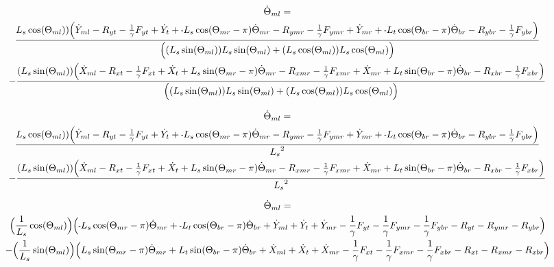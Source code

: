 \documentclass[11pt, landscape]{article}
\newcommand{\mn}{\scalebox{0.7}[1.0]{-}}
\begin{document}
\begin{multline}
\dot{\Theta}_{ml} = \\
\frac{L_{s}\cos(\Theta_{ml})) \Big( \dot{Y}_{ml} - R_{yt} - \frac{1}{\gamma}F_{yt } + \dot{Y}_{t } + \mn L_{s}\cos(\Theta_{mr}-\pi)  \dot{\Theta}_{mr}
- R_{ymr} - \frac{1}{\gamma}F_{ymr} + \dot{Y}_{mr} + \mn L_{t}\cos(\Theta_{br}-\pi)  \dot{\Theta}_{br} - R_{ybr} - \frac{1}{\gamma}F_{ybr}\Big)}
{\Big((L_{s}\sin(\Theta_{ml}))L_{s}\sin(\Theta_{ml}) + (L_{s}\cos(\Theta_{ml}))L_{s}\cos(\Theta_{ml}) \Big)} \\
- \frac{(L_{s}\sin(\Theta_{ml}))\Big( \dot{X}_{ml} - R_{xt } - \frac{1}{\gamma}F_{xt } + \dot{X}_{t } + L_{s}\sin(\Theta_{mr}-\pi)  \dot{\Theta}_{mr}
- R_{xmr} - \frac{1}{\gamma}F_{xmr} + \dot{X}_{mr} + L_{t}\sin(\Theta_{br}-\pi)  \dot{\Theta}_{br} - R_{xbr} - \frac{1}{\gamma}F_{xbr} \Big)}
{\Big((L_{s}\sin(\Theta_{ml}))L_{s}\sin(\Theta_{ml}) + (L_{s}\cos(\Theta_{ml}))L_{s}\cos(\Theta_{ml}) \Big)}
\end{multline}

\begin{multline}
\dot{\Theta}_{ml} = \\
\frac{L_{s}\cos(\Theta_{ml})) \Big( \dot{Y}_{ml} - R_{yt} - \frac{1}{\gamma}F_{yt } + \dot{Y}_{t } + \mn L_{s}\cos(\Theta_{mr}-\pi)  \dot{\Theta}_{mr}
- R_{ymr} - \frac{1}{\gamma}F_{ymr} + \dot{Y}_{mr} + \mn L_{t}\cos(\Theta_{br}-\pi)  \dot{\Theta}_{br} - R_{ybr} - \frac{1}{\gamma}F_{ybr}\Big)}
{{L_s}^2} \\
- \frac{(L_{s}\sin(\Theta_{ml}))\Big( \dot{X}_{ml} - R_{xt } - \frac{1}{\gamma}F_{xt } + \dot{X}_{t } + L_{s}\sin(\Theta_{mr}-\pi)  \dot{\Theta}_{mr}
- R_{xmr} - \frac{1}{\gamma}F_{xmr} + \dot{X}_{mr} + L_{t}\sin(\Theta_{br}-\pi)  \dot{\Theta}_{br} - R_{xbr} - \frac{1}{\gamma}F_{xbr} \Big)}
{{L_s}^2}
\end{multline}

\begin{multline}
\dot{\Theta}_{ml} = \\
\Big(\frac{1}{L_s}\cos(\Theta_{ml})\Big) \Big( \mn L_{s}\cos(\Theta_{mr}-\pi)\dot{\Theta}_{mr} + \mn L_{t}\cos(\Theta_{br}-\pi)\dot{\Theta}_{br}
 + \dot{Y}_{ml} + \dot{Y}_{t } + \dot{Y}_{mr} - \frac{1}{\gamma}F_{yt } - \frac{1}{\gamma}F_{ymr} - \frac{1}{\gamma}F_{ybr} - R_{yt} - R_{ymr} - R_{ybr} \Big) \\
- \Big(\frac{1}{L_s}\sin(\Theta_{ml})\Big)\Big(L_{s}\sin(\Theta_{mr}-\pi)  \dot{\Theta}_{mr} + L_{t}\sin(\Theta_{br}-\pi)\dot{\Theta}_{br}
+ \dot{X}_{ml} + \dot{X}_{t } + \dot{X}_{mr} - \frac{1}{\gamma}F_{xt } - \frac{1}{\gamma}F_{xmr} - \frac{1}{\gamma}F_{xbr} - R_{xt } - R_{xmr} - R_{xbr} \Big)
\end{multline}
\end{document}
